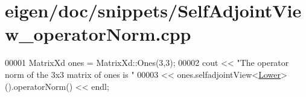 \hypertarget{eigen_2doc_2snippets_2_self_adjoint_view__operator_norm_8cpp_source}{}\section{eigen/doc/snippets/\+Self\+Adjoint\+View\+\_\+operator\+Norm.cpp}
\label{eigen_2doc_2snippets_2_self_adjoint_view__operator_norm_8cpp_source}

\begin{DoxyCode}
00001 MatrixXd ones = MatrixXd::Ones(3,3);
00002 cout << \textcolor{stringliteral}{"The operator norm of the 3x3 matrix of ones is "}
00003      << ones.selfadjointView<\hyperlink{group__enums_gga39e3366ff5554d731e7dc8bb642f83cda891792b8ed394f7607ab16dd716f60e6}{Lower}>().operatorNorm() << endl;
\end{DoxyCode}
